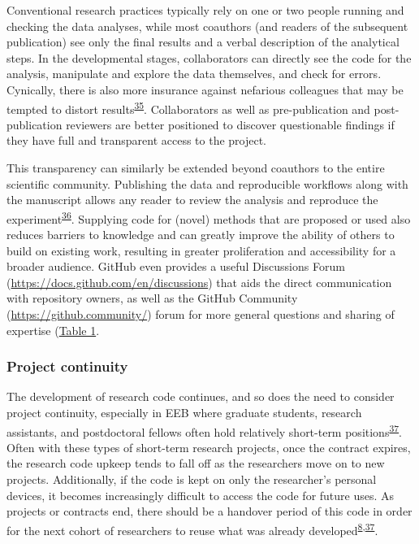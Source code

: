 Conventional research practices typically rely on one or two people running and checking the data analyses, while most coauthors (and readers of the subsequent publication) see only the final results and a verbal description of the analytical steps.
In the developmental stages, collaborators can directly see the code for the analysis, manipulate and explore the data themselves, and check for errors.
Cynically, there is also more insurance against nefarious colleagues that may be tempted to distort results\textsuperscript{\protect\hyperlink{ref-18PTmKJkq}{35}}.
Collaborators as well as pre-publication and post-publication reviewers are better positioned to discover questionable findings if they have full and transparent access to the project.

This transparency can similarly be extended beyond coauthors to the entire scientific community.
Publishing the data and reproducible workflows along with the manuscript allows any reader to review the analysis and reproduce the experiment\textsuperscript{\protect\hyperlink{ref-NOgBWVAr}{36}}.
Supplying code for (novel) methods that are proposed or used also reduces barriers to knowledge and can greatly improve the ability of others to build on existing work, resulting in greater proliferation and accessibility for a broader audience.
GitHub even provides a useful Discussions Forum (\url{https://docs.github.com/en/discussions}) that aids the direct communication with repository owners, as well as the GitHub Community (\url{https://github.community/}) forum for more general questions and sharing of expertise (\protect\hyperlink{tbl:roles}{Table 1}.

\hypertarget{project-continuity}{%
\subsubsection{Project continuity}\label{project-continuity}}

The development of research code continues, and so does the need to consider project continuity, especially in EEB where graduate students, research assistants, and postdoctoral fellows often hold relatively short-term positions\textsuperscript{\protect\hyperlink{ref-D4C4k4ak}{37}}.
Often with these types of short-term research projects, once the contract expires, the research code upkeep tends to fall off as the researchers move on to new projects.
Additionally, if the code is kept on only the researcher's personal devices, it becomes increasingly difficult to access the code for future uses.
As projects or contracts end, there should be a handover period of this code in order for the next cohort of researchers to reuse what was already developed\textsuperscript{\protect\hyperlink{ref-4ny1onB0}{8},\protect\hyperlink{ref-D4C4k4ak}{37}}.

